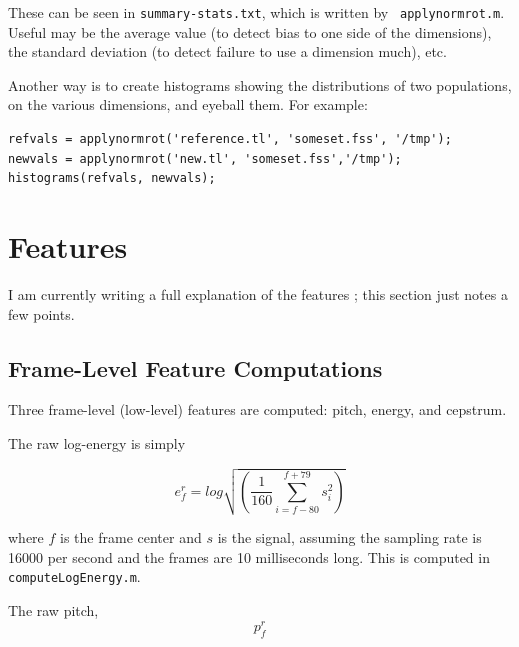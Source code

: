 \documentclass[11pt]{article}
\begin{document}
These can be seen in {\tt summary-stats.txt}, which is written by {\tt
  applynormrot.m}.  Useful may be the average value (to detect bias to
one side of the dimensions), the standard deviation (to detect failure
to use a dimension much), etc.

Another way is to create histograms showing the distributions of two
populations, on the various dimensions, and eyeball them.  For example:

\begin{verbatim}
refvals = applynormrot('reference.tl', 'someset.fss', '/tmp');
newvals = applynormrot('new.tl', 'someset.fss','/tmp');
histograms(refvals, newvals);
\end{verbatim}




\section{Features}               \label{sec:features}

I am currently writing a full explanation of the features
\cite{mid-level-features}; this section just notes a few points. 

\subsection{Frame-Level Feature Computations}

Three frame-level (low-level) features are computed: pitch, energy,
and cepstrum.

The raw log-energy is simply

\begin{equation}
e_f^r = log \sqrt{(\frac{1}{160} \sum\limits_{i=f-80}^{f+79} s_i^2)}
\end{equation}

where $f$ is the frame center and $s$ is the signal, assuming the
sampling rate is 16000 per second and the frames are 10 milliseconds
long.  This is computed in {\tt computeLogEnergy.m}.

The  raw pitch,
\begin{equation}
   p^r_f
\end{equation}
\end{document}
